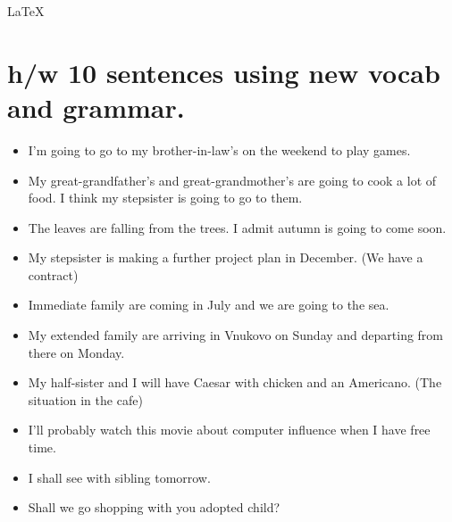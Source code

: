 \documentclass{article}
\begin{document}
\begin{center}
    \LaTeX
\end{center}

\pagestyle{plain}

\section*{h/w 10  sentences  using new vocab and grammar.}

\begin{itemize}
    \item I'm going to go to my brother-in-law's on the weekend to play games.
    \item My great-grandfather’s and great-grandmother’s are going to cook a lot of food. I think my stepsister is going to go to them.
    \item The leaves are falling from the trees. I admit autumn is going to come soon. 
    \item My stepsister is making a further project plan in December. (We have a contract)
    \item Immediate family are coming in July and we are going to the sea.
    \item My extended family are arriving in Vnukovo on Sunday and departing from there on Monday. 
    \item My half-sister and I will have Caesar with chicken and an Americano. (The situation in the cafe)
    \item I’ll probably watch this movie about computer influence when I have free time.
    \item I shall see with sibling tomorrow.
    \item Shall we go shopping with you adopted child?
\end{itemize}
\end{document}
